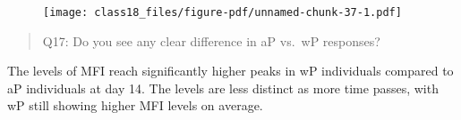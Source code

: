 \documentclass[
  letterpaper,
  DIV=11,
  numbers=noendperiod]{scrartcl}
\begin{document}
\begin{figure}[H]

{\centering \texttt{[image: class18\_files/figure-pdf/unnamed-chunk-37-1.pdf]}

}

\end{figure}

\begin{quote}
Q17: Do you see any clear difference in aP vs.~wP responses?
\end{quote}

The levels of MFI reach significantly higher peaks in wP individuals
compared to aP individuals at day 14. The levels are less distinct as
more time passes, with wP still showing higher MFI levels on average.
\end{document}
